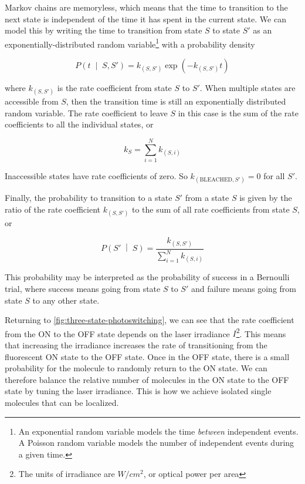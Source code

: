 \documentclass[10pt,a4paper]{book}
\newcommand{\given}{\;\middle|\;}
\begin{document}
Markov chains are memoryless, which means that the time to transition to the next state is independent of the time it has spent in the current state. We can model this by writing the time to transition from state $S$ to state $S'$ as an exponentially-distributed random variable\footnote{An exponential random variable models the time \textit{between} independent events. A Poisson random variable models the number of independent events during a given time.} with a probability density

\begin{equation}
    P \left(t \given S, S' \right) = k_{ \left( S, S' \right)} \exp \left( -k_{ \left( S, S' \right) } t \right)
\end{equation}

\noindent where $k_{ \left( S, S' \right)}$ is the rate coefficient from state $S$ to $S'$. When multiple states are accessible from $S$, then the transition time is still an exponentially distributed random variable. The rate coefficient to leave $S$ in this case is the sum of the rate coefficients to all the individual states, or

\begin{equation}
    k_S = \sum_{i = 1}^N k_{ \left( S, i \right) }
\end{equation}

\noindent Inaccessible states have rate coefficients of zero. So $k_{\left( \text{BLEACHED}, S' \right)} = 0$ for all $S'$.

Finally, the probability to transition to a state $S'$ from a state $S$ is given by the ratio of the rate coefficient $k_{ \left( S, S'\right)}$ to the sum of all rate coefficients from state $S$, or

\begin{equation}
    P \left(S' \given S \right) = \frac{k_{\left( S, S' \right)}}{\sum_{i = 1}^N k_{ \left( S, i \right) }}
\end{equation}

\noindent This probability may be interpreted as the probability of success in a Bernoulli trial, where success means going from state $S$ to $S'$ and failure means going from state $S$ to any other state.

Returning to \autoref{fig:three-state-photoswitching}, we can see that the rate coefficient from the ON to the OFF state depends on the laser irradiance $I$\footnote{The units of irradiance are $W / cm^2$, or optical power per area}. This means that increasing the irradiance increases the rate of transitioning from the fluorescent ON state to the OFF state. Once in the OFF state, there is a small probability for the molecule to randomly return to the ON state. We can therefore balance the relative number of molecules in the ON state to the OFF state by tuning the laser irradiance. This is how we achieve isolated single molecules that can be localized.
\end{document}
